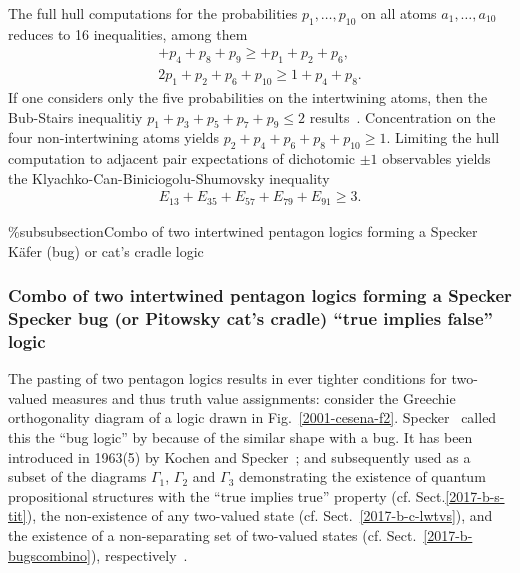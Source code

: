 The full hull computations for the probabilities $p_1, \ldots , p_{10}$
on all atoms $a_1, \ldots , a_{10}$
reduces to 16 inequalities, among them
\begin{equation}
\begin{split}
      + p_4              + p_8  + p_9               \ge          + p_1 + p_2    +p_6,       \\
   2p_1 + p_2             + p_6                + p_{10}     \ge           1  + p_4   + p_8.
\label{2017-b-completepp}
\end{split}
\end{equation}
If one considers only the five probabilities on the intertwining atoms,
then the Bub-Stairs inequalitiy
$p_1+p_3+p_5+p_7+p_9 \le 2$
results~\cite{Bub-2009,Bub-2010,Badziag-2011}.
Concentration on the four non-intertwining atoms yields $p_2+p_4+p_6+p_8+p_{10} \ge 1$.
Limiting the hull computation to adjacent pair expectations of dichotomic $\pm 1$ observables
yields the Klyachko-Can-Biniciogolu-Shumovsky inequality~\cite{Klyachko-2008}
\begin{equation}
\begin{split}
E_{13}  + E_{35}  + E_{57}  + E_{79}  + E_{91}   \ge 3
.
\end{split}
\label{2017-b-klyacbs}
\end{equation}


\%subsubsection{Combo of two intertwined pentagon logics forming a Specker K\"afer (bug) or cat's cradle logic}

%



\subsubsection{Combo of two intertwined pentagon logics forming a Specker Specker bug (or Pitowsky cat's cradle) ``true implies false'' logic}
\label{2017-b-s-tif}
\label{2017-b-speckerbug}


The pasting of two pentagon logics results in ever tighter conditions for two-valued measures and thus truth value assignments:
consider the Greechie orthogonality diagram of a logic drawn in Fig.~\ref{2001-cesena-f2}.
Specker~\cite{Specker-priv} called this the ``bug logic'' by because of the similar shape with a bug.
It has been introduced in 1963(5) by Kochen and Specker~\cite[Fig.~1, p.~182]{kochen2};
and subsequently used as a subset of the diagrams $\Gamma_1$, $\Gamma_2$ and $\Gamma_3$ demonstrating
the existence of quantum propositional structures with the ``true implies true'' property (cf. Sect.\ref{2017-b-s-tit}),
the non-existence of any two-valued state (cf. Sect.~\ref{2017-b-c-lwtvs}),
and the existence of a non-separating set of two-valued states (cf. Sect.~\ref{2017-b-bugscombino}), respectively~\cite{kochen1}.

